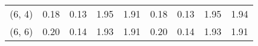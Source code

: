 \begin{tabular}{lrrrrrrrr}
(6, 4)        &                                               0.18 &                                            0.13 &                            1.95 &                                  1.91 &                                               0.18 &                                            0.13 &                            1.95 &                                  1.94 \\
(6, 6)        &                                               0.20 &                                            0.14 &                            1.93 &                                  1.91 &                                               0.20 &                                            0.14 &                            1.93 &                                  1.91 \\
\bottomrule
\end{tabular}

